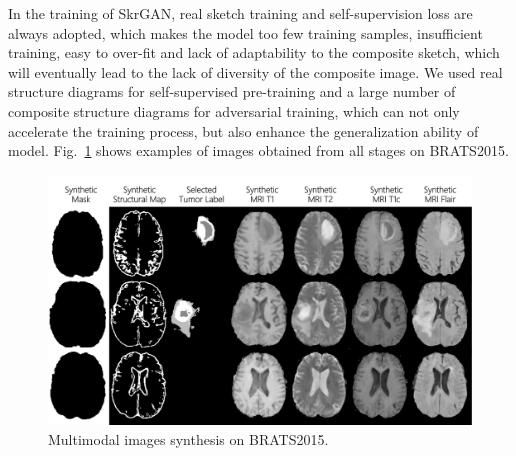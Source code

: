 \documentclass[runningheads]{llncs}
\begin{document}
In the training of SkrGAN\cite{96zhang2019skrgan:}, real sketch training and self-supervision loss are always adopted, which makes the model too few training samples, insufficient training, easy to over-fit and lack of adaptability to the composite sketch, which will eventually lead to the lack of diversity of the composite image. We used real structure diagrams for self-supervised pre-training and a large number of composite structure diagrams for adversarial training, which can not only accelerate the training process, but also enhance the generalization ability of model. Fig.~\ref{generated_mri} shows examples of images obtained from all stages on BRATS2015.
\begin{figure}
	\centering
	\includegraphics[width=0.65\linewidth]{figures/F_to_MRI}
	\caption{Multimodal images synthesis on BRATS2015.}
	\label{generated_mri}
\end{figure}
\end{document}
